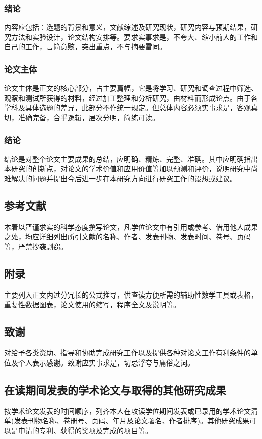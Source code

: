 \subsubsection{绪论}
内容应包括：选题的背景和意义，文献综述及研究现状，研究内容与预期结果，研究方法和实验设计，论文结构安排等。要求实事求是，不夸大、缩小前人的工作和自己的工作，言简意赅，突出重点，不与摘要雷同。
\subsubsection{论文主体}
论文主体是正文的核心部分，占主要篇幅，它是将学习、研究和调查过程中筛选、观察和测试所获得的材料，经过加工整理和分析研究，由材料而形成论点。由于各学科及具体选题的差异，此部分不作统一规定。但总体内容必须实事求是，客观真切，准确完备，合乎逻辑，层次分明，简练可读。
\subsubsection{结论}
结论是对整个论文主要成果的总结，应明确、精炼、完整、准确。其中应明确指出本研究的创新点，对论文的学术价值和应用价值等加以预测和评价，说明研究中尚难解决的问题并提出今后进一步在本研究方向进行研究工作的设想或建议。

\subsection{参考文献}
本着以严谨求实的科学态度撰写论文，凡学位论文中有引用或参考、借用他人成果之处，均应详细列出所引文献的名称、作者、发表刊物、发表时间、卷号、页码等，严禁抄袭剽窃。　　
\subsection{附录}
主要列入正文内过分冗长的公式推导，供查读方便所需的辅助性数学工具或表格，重复性数据图表，论文使用的缩写，程序全文及说明等。

\subsection{致谢}
对给予各类资助、指导和协助完成研究工作以及提供各种对论文工作有利条件的单位及个人表示感谢。致谢应实事求是，切忌浮夸与庸俗之词。

\subsection{在读期间发表的学术论文与取得的其他研究成果}
按学术论文发表的时间顺序，列齐本人在攻读学位期间发表或已录用的学术论文清单(发表刊物名称、卷册号、页码、年月及论文署名、作者排序)。其他研究成果可以是申请的专利、获得的奖项及完成的项目等。
 
